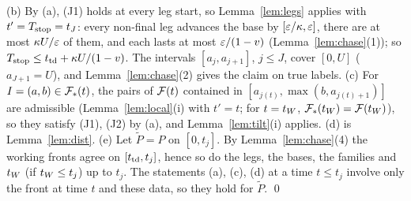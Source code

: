 (b) By (a), (J1) holds at every leg start, so Lemma~\ref{lem:legs} applies with $t'=T_{\mathrm{stop}}=t_J$: every non-final leg advances the base by
$[\varepsilon/\kappa,\varepsilon]$, there are at most $\kappa U/\varepsilon$ of them, and each lasts at most $\varepsilon/(1-v)$ (Lemma~\ref{lem:chase}(1)); so
$T_{\mathrm{stop}}\le t_{\mathrm{td}}+\kappa U/(1-v)$. The intervals $[a_j,a_{j+1}]$, $j\le J$, cover $[0,U]$ ($a_{J+1}=U$), and Lemma~\ref{lem:chase}(2) gives
the claim on true labels.
(c) For $I=(a,b)\in\mathcal F_*(t)$, the pairs of $\mathcal F(t)$ contained in $[a_{j(t)},\max(b,a_{j(t)+1})]$ are admissible
(Lemma~\ref{lem:local}(i) with $t'=t$; for $t=t_W$, $\mathcal F_*(t_W)=\mathcal F(t_W)$), so they satisfy (J1), (J2) by (a), and Lemma~\ref{lem:tilt}(i)
applies.
(d) is Lemma~\ref{lem:dist}.
(e) Let $\tilde P=P$ on $[0,t_j]$. By Lemma~\ref{lem:chase}(4) the working fronts agree on $[t_{\mathrm{td}},t_j]$, hence so do the legs, the bases,
the families and $t_W$ (if $t_W\le t_j$) up to $t_j$. The statements (a), (c), (d) at a time $t\le t_j$ involve only the front at time $t$
and these data, so they hold for $\tilde P$. \qed
